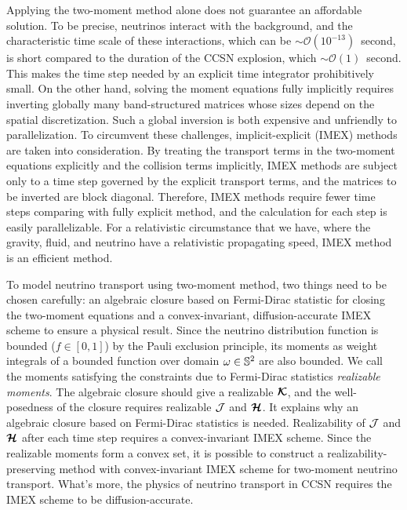 Applying the two-moment method alone does not guarantee an affordable solution.
To be precise, neutrinos interact with the background, and the characteristic time scale of these interactions, which can be $\sim\mathcal{O}(10^{-13})$~second, is short compared to the duration of the CCSN explosion, which $\sim\mathcal{O}(1)$~second.  
This makes the time step needed by an explicit time integrator prohibitively small. 
On the other hand, solving the moment equations fully implicitly requires inverting globally many band-structured matrices whose sizes depend on the spatial discretization.
Such a global inversion is both expensive and unfriendly to parallelization.
To circumvent these challenges, implicit-explicit (IMEX) methods are taken into consideration.
By treating the transport terms in the two-moment equations explicitly and the collision terms implicitly, IMEX methods are subject only to a time step governed by the explicit transport terms, and the matrices to be inverted are block diagonal.
Therefore, IMEX methods require fewer time steps comparing with fully explicit method, and the calculation for each step is easily parallelizable.  
For a relativistic circumstance that we have, where the gravity, fluid, and neutrino have a relativistic propagating speed, IMEX method is an efficient method.

To model neutrino transport using two-moment method, two things need to be chosen carefully: an algebraic closure based on Fermi-Dirac statistic for closing the two-moment equations and a convex-invariant, diffusion-accurate IMEX scheme to ensure a physical result.
Since the neutrino distribution function is bounded ($f\in[0,1]$) by the Pauli exclusion principle, its moments as weight integrals of a bounded function over domain $\omega\in\mathbb{S}^{2}$ are also bounded.
We call the moments satisfying the constraints due to Fermi-Dirac statistics \textit{realizable moments}.
The algebraic closure should give a realizable $\boldsymbol{\mathcal{K}}$, and the well-posedness of the closure requires realizable $\mathcal{J}$ and $\boldsymbol{\mathcal{H}}$.
It explains why an algebraic closure based on Fermi-Dirac statistics is needed.
Realizability of $\mathcal{J}$ and $\boldsymbol{\mathcal{H}}$ after each time step requires a convex-invariant IMEX scheme.
Since the realizable moments form a convex set, it is possible to construct a realizability-preserving method with convex-invariant IMEX scheme for two-moment neutrino transport.
What's more, the physics of neutrino transport in CCSN requires the IMEX scheme to be diffusion-accurate.

